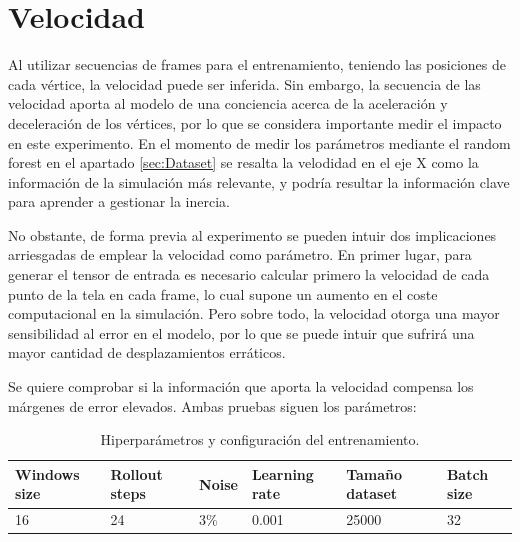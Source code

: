 \section{Velocidad}
Al utilizar secuencias de frames para el entrenamiento, teniendo las posiciones de cada vértice, la velocidad puede ser inferida. Sin embargo, la secuencia de las velocidad aporta al modelo de una conciencia acerca de la aceleración y deceleración de los vértices, por lo que se considera importante medir el impacto en este experimento. En el momento de medir los parámetros mediante el random forest en el apartado \ref{sec:Dataset} se resalta la velodidad en el eje X como la información de la simulación más relevante, y podría resultar la información clave para aprender a gestionar la inercia.

No obstante, de forma previa al experimento se pueden intuir dos implicaciones arriesgadas de emplear la velocidad como parámetro. En primer lugar, para generar el tensor de entrada es necesario calcular primero la velocidad de cada punto de la tela en cada frame, lo cual supone un aumento en el coste computacional en la simulación. Pero sobre todo, la velocidad otorga una mayor sensibilidad al error en el modelo, por lo que se puede intuir que sufrirá una mayor cantidad de desplazamientos erráticos.

Se quiere comprobar si la información que aporta la velocidad compensa los márgenes de error elevados.
Ambas pruebas siguen los parámetros:
\begin{table}[H]
    \begin{center}
        \begin{tabular}{ | m{2.2cm} | m{2cm} | m{1.2cm} | m{2.1cm} | m{2.4cm} | m{2.2cm} | }
        \hline \textbf{Windows size} & \textbf{Rollout steps} & \textbf{Noise} & \textbf{Learning rate} & \textbf{Tamaño dataset} & \textbf{Batch size} \\ \hline
            16 & 24 & 3\% & 0.001 & 25000 & 32 \\ \hline
        \end{tabular}
            \end{center}
    \caption{Hiperparámetros y configuración del entrenamiento.}
    \label{tab:randomTraining}
\end{table}

